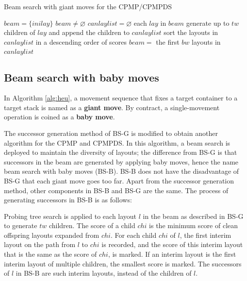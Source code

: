 \documentclass[review,3p,times,authoryear,12pt]{elsarticle}
\begin{document}
\begin{algorithm*}[htbp]
	\caption{Beam search with giant moves for the CPMP/CPMPDS}
	\label{alg:bsg}
	\begin{codebox}
    \li $\mathit{beam} = \{\mathit{inilay}\}$
    \li \While $\mathit{beam} \neq \varnothing$
    \li \Do
        $\mathit{canlaylist}=\varnothing$
    \li \For each $\mathit{lay}$ in $\mathit{beam}$
    \li     \Do
             generate up to $\mathit{tw}$ children of $\mathit{lay}$ and append the children to $\mathit{canlaylist}$
             \End
    \li     sort the layouts in $\mathit{canlaylist}$ in a descending order of scores
    \li     $\mathit{beam} =$ the first $\mathit{bw}$ layouts in $\mathit{canlaylist}$
        \End
	\end{codebox}	
\end{algorithm*}

\subsection{Beam search with baby moves}

In Algorithm \ref{alg:heu}, a movement sequence that fixes a target container to a target stack is named as a \textbf{giant move}.
By contract, a single-movement operation is coined as a \textbf{baby move}.

The successor generation method of BS-G is modified to obtain another algorithm for the CPMP and CPMPDS.
In this algorithm, a beam search is deployed to maintain the diversity of layouts; the difference from BS-G is that successors in the beam are generated by applying baby moves, hence the name beam search with baby moves (BS-B).
BS-B does not have the disadvantage of BS-G that each giant move goes too far.
Apart from the successor generation method, other components in BS-B and BS-G are the same.
The process of generating successors in BS-B is as follows:

Probing tree search is applied to each layout $l$ in the beam as described in BS-G to generate $\mathit{tw}$ children.
The score of a child $\mathit{chi}$ is the minimum score of clean offspring layouts expanded from $\mathit{chi}$.
For each child $\mathit{chi}$ of $l$, the first interim layout on the path from $l$ to $\mathit{chi}$ is recorded, and the score of this interim layout that is the same as the score of $\mathit{chi}$, is marked.
If an interim layout is the first interim layout of multiple children, the smallest score is marked.
The successors of $l$ in BS-B are such interim layouts, instead of the children of $l$.
\end{document}

